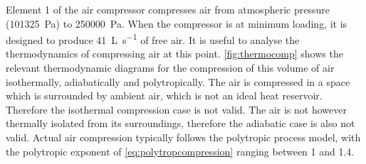Element 1 of the air compressor compresses air from atmospheric pressure (\SI{101325}{\pascal}) to \SI{250000}{\pascal}. When the compressor is at minimum loading, it is designed to produce \SI{41}{\liter \per \second} of free air. It is useful to analyse the thermodynamics of compressing air at this point. \autoref{fig:thermocomp} shows the relevant thermodynamic diagrams for the compression of this volume of air isothermally, adiabatically and polytropically. The air is compressed in a space which is surrounded by ambient air, which is not an ideal heat reservoir. Therefore the isothermal compression case is not valid. The air is not however thermally isolated from its surroundings, therefore the adiabatic case is also not valid. Actual air compression typically follows the polytropic process model, with the polytropic exponent of \autoref{eq:polytropcompression} ranging between 1 and 1.4.


